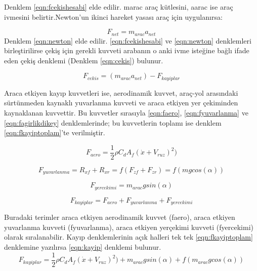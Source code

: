 Denklem \ref{eqn:fcekishesabi} elde edilir. \acrshort{marac} araç kütlesini, \acrshort{aarac} ise araç ivmesini belirtir.Newton'un ikinci hareket yasası araç için uygulanırsa:

\begin{equation}
    F_{net} = m_{arac} a_{net}
    \label{eqn:newton}
\end{equation}
Denklem \ref{eqn:newton} elde edilir. \ref{eqn:fcekishesabi} ve \ref{eqn:newton} denklemleri birleştirilirse çekiş için gerekli kuvveti arabanın o anki ivme isteğine bağlı ifade eden çekiş denklemi
(Denklem \ref{eqn:cekis}) bulunur.

\begin{equation}
    F_{cekis}=(m_{arac} a_{net})-F_{kayiplar}
    \label{eqn:cekis}
\end{equation}

Araca etkiyen kayıp kuvvetleri ise, aerodinamik kuvvet, araç-yol arasındaki sürtünmeden kaynaklı yuvarlanma kuvveti ve araca etkiyen yer çekiminden kaynaklanan kuvvettir. 
Bu kuvvetler sırasıyla \ref{eqn:faero}, \ref{eqn:fyuvarlanma} ve \ref{eqn:fagirlikdikey} denklemlerinde; bu kuvvetlerin toplamı ise denklem \ref{eqn:fkayiptoplam}'te verilmiştir.

\begin{equation}
    F_{aero}=\frac{1}{2}\rho C_dA_f(\dot{x}+V_{ruz})^2)
    \label{eqn:faero}
\end{equation}

\begin{equation}
    F_{yuvarlanma}=R_{xf}+R_{xr}=f(F_{zf}+F_{zr})=f(mgcos(\alpha))
    \label{eqn:fyuvarlanma}
\end{equation}

\begin{equation}
    F_{yercekimi}=m_{arac}gsin(\alpha)
    \label{eqn:fagirlikdikey}
\end{equation}


\begin{equation}
    F_{kayiplar}=F_{aero}+F_{yuvarlanma}+F_{yercekimi}
    \label{eqn:fkayiptoplam}
\end{equation}

Buradaki terimler araca etkiyen aerodinamik kuvvet (\acrshort{faero}), araca etkiyen yuvarlanma kuvveti (\acrshort{fyuvarlanma}), araca etkiyen yerçekimi kuvveti (\acrshort{fyercekimi}) olarak sıralanabilir. Kayıp denklemlerinin açık halleri tek tek \ref{eqn:fkayiptoplam} denklemine yazılırsa
\ref{eqn:kayip} denklemi bulunur.
\begin{equation}
    F_{kayiplar}=\frac{1}{2}\rho C_dA_f(\dot{x}+V_{ruz})^2)+m_{arac}gsin(\alpha)+f(m_{arac}gcos(\alpha))
    \label{eqn:kayip}
\end{equation}

